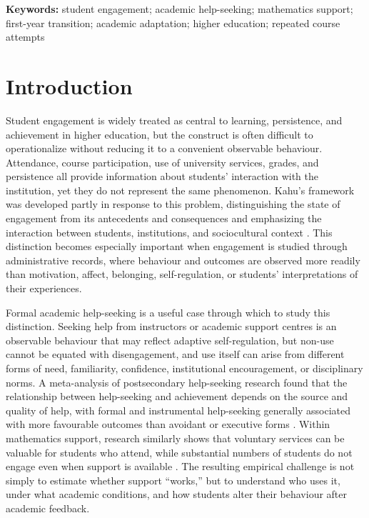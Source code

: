 \documentclass[11pt,a4paper]{article}
\begin{document}
\noindent\textbf{Keywords:} student engagement; academic help-seeking; mathematics support; first-year transition; academic adaptation; higher education; repeated course attempts

\section{Introduction}

Student engagement is widely treated as central to learning, persistence, and achievement in higher education, but the construct is often difficult to operationalize without reducing it to a convenient observable behaviour. Attendance, course participation, use of university services, grades, and persistence all provide information about students' interaction with the institution, yet they do not represent the same phenomenon. Kahu's framework was developed partly in response to this problem, distinguishing the state of engagement from its antecedents and consequences and emphasizing the interaction between students, institutions, and sociocultural context \citep{kahu2013}. This distinction becomes especially important when engagement is studied through administrative records, where behaviour and outcomes are observed more readily than motivation, affect, belonging, self-regulation, or students' interpretations of their experiences.

Formal academic help-seeking is a useful case through which to study this distinction. Seeking help from instructors or academic support centres is an observable behaviour that may reflect adaptive self-regulation, but non-use cannot be equated with disengagement, and use itself can arise from different forms of need, familiarity, confidence, institutional encouragement, or disciplinary norms. A meta-analysis of postsecondary help-seeking research found that the relationship between help-seeking and achievement depends on the source and quality of help, with formal and instrumental help-seeking generally associated with more favourable outcomes than avoidant or executive forms \citep{fong2023}. Within mathematics support, research similarly shows that voluntary services can be valuable for students who attend, while substantial numbers of students do not engage even when support is available \citep{macanbhaird2013,lawson2020,mullen2024}. The resulting empirical challenge is not simply to estimate whether support ``works,'' but to understand who uses it, under what academic conditions, and how students alter their behaviour after academic feedback.
\end{document}
